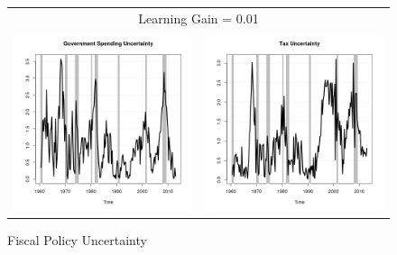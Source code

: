 \documentclass[11pt]{article}
\begin{document}
\begin{figure}\caption{Fiscal Policy Uncertainty}\label{fg:fpu0.01}
\begin{center}
\begin{tabular}{cc}
\multicolumn{2}{c}{Learning Gain = 0.01} \\ [0.5pc]
\includegraphics[scale=0.45]{./results/pics0.01/fpu_gov.png} & \includegraphics[scale=0.45]{./results/pics0.01/fpu_tax.png} \\

\end{tabular}
\end{center}
\end{figure}
\end{document}
